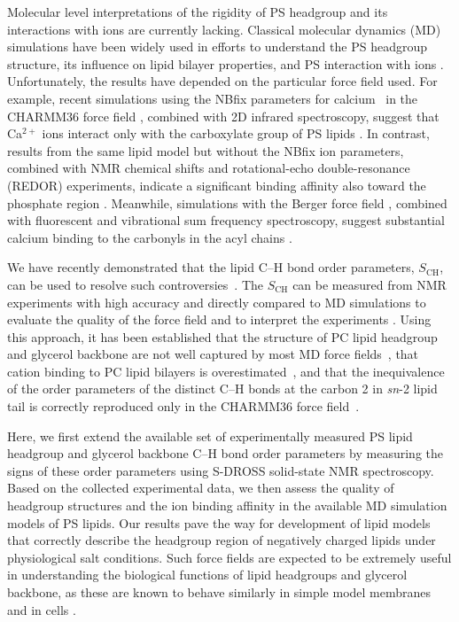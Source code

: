 \documentclass[journal=jpcbfk,manuscript=article]{achemso}
\begin{document}
Molecular level interpretations of the rigidity of PS headgroup and its interactions with ions
are currently lacking. Classical molecular dynamics (MD) simulations have been widely used in efforts 
to understand the PS headgroup structure, its influence on lipid bilayer properties, and PS
interaction with
ions \cite{cascales96,pandit02,mukhopadhyay04,pedersen06,vernier09,boettcher11,molina12,jurkiewicz12,venable13,pan14,vangaveti14,melcrova16,valentine18,hallock18}.
Unfortunately, the results have depended on the particular force field used.
For example, recent simulations using the NBfix parameters for calcium~\cite{kim16} in
the CHARMM36 force field \cite{klauda10,venable13}, combined with 2D infrared spectroscopy,
suggest that Ca$^{2+}$ ions interact only with the carboxylate group of PS lipids \cite{valentine18}. In contrast,
results from the same lipid model but without the NBfix ion parameters, combined with NMR chemical shifts and
rotational-echo double-resonance (REDOR) experiments, indicate a significant binding affinity also toward the phosphate region \cite{hallock18}.
Meanwhile, simulations with the Berger force field \cite{berger97,mukhopadhyay04},
combined with fluorescent and vibrational sum frequency spectroscopy, suggest substantial
calcium binding to the carbonyls in the acyl chains \cite{melcrova16}.

We have recently demonstrated that the lipid C--H bond order parameters, $S_\mathrm{CH}$,
can be used to resolve such controversies~\cite{botan15,catte16}. The $S_\mathrm{CH}$ can be
measured from NMR experiments with high accuracy and directly compared to MD simulations
to evaluate the quality of the force field and to interpret the experiments \cite{ollila16}. Using this approach,
it has been established that the structure of PC lipid headgroup and glycerol backbone are not well
captured by most MD force fields~\cite{botan15}, that cation binding to PC
lipid bilayers is overestimated~\cite{catte16}, and that the inequivalence of the order parameters of the distinct C--H bonds at
the carbon 2 in {\it sn}-2 lipid tail is correctly reproduced only in the CHARMM36 force field~\cite{piggot17}.

Here, we first extend the available set of experimentally measured PS lipid headgroup and
glycerol backbone C--H bond order parameters
by measuring the signs of these order parameters using S-DROSS solid-state NMR spectroscopy.
Based on the collected experimental data, we then assess
the quality of headgroup structures and the ion binding affinity in
the available MD simulation models of PS lipids.
Our results pave the way
for development of lipid models that correctly describe 
the headgroup region of negatively charged lipids under physiological salt
conditions. Such force fields are expected to be extremely useful in understanding
the biological functions of lipid headgroups and glycerol backbone, as
these are known to behave similarly in simple model membranes and in cells \cite{gally81,scherer87,seelig90}.
\end{document}
